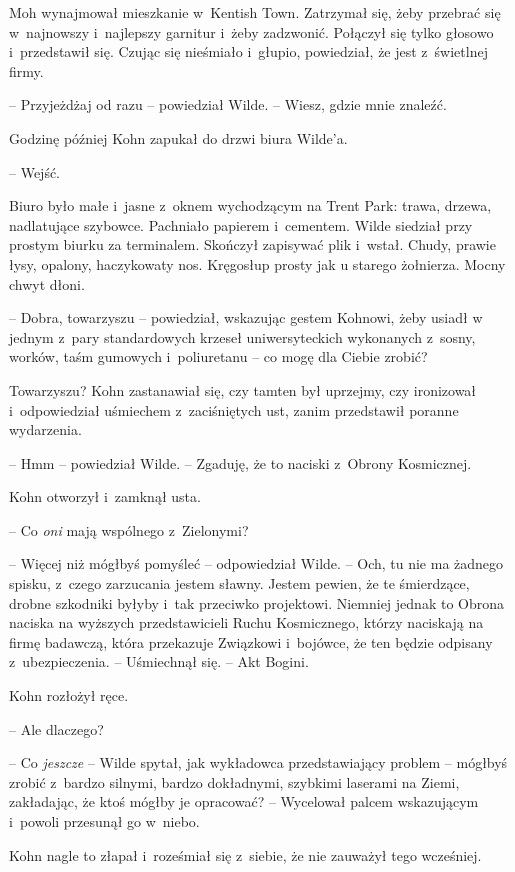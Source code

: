 \documentclass[oneside,polish,11pt,sfheadings]{mwbk}
\begin{document}
Moh wynajmował mieszkanie w~Kentish Town. Zatrzymał się, żeby przebrać
się w~najnowszy i~najlepszy garnitur i~żeby zadzwonić. Połączył się
tylko głosowo i~przedstawił się. Czując się nieśmiało i~głupio,
powiedział, że jest z~świetlnej firmy.

-- Przyjeżdżaj od razu -- powiedział Wilde. -- Wiesz, gdzie mnie znaleźć.

Godzinę później Kohn zapukał do drzwi biura Wilde'a.

-- Wejść.

Biuro było małe i~jasne z~oknem wychodzącym na Trent Park: trawa,
drzewa, nadlatujące szybowce. Pachniało papierem i~cementem. Wilde
siedział przy prostym biurku za terminalem. Skończył zapisywać plik i~wstał. Chudy, prawie łysy, opalony, haczykowaty nos. Kręgosłup prosty
jak u starego żołnierza. Mocny chwyt dłoni.

-- Dobra, towarzyszu -- powiedział, wskazując gestem Kohnowi, żeby usiadł
w jednym z~pary standardowych krzeseł uniwersyteckich wykonanych z~sosny, worków, taśm gumowych i~poliuretanu -- co mogę dla Ciebie zrobić?

Towarzyszu? Kohn zastanawiał się, czy tamten był uprzejmy, czy
ironizował i~odpowiedział uśmiechem z~zaciśniętych ust, zanim
przedstawił poranne wydarzenia.

-- Hmm -- powiedział Wilde. -- Zgaduję, że to naciski z~Obrony Kosmicznej.

Kohn otworzył i~zamknął usta.

 -- Co \emph{oni} mają wspólnego z~Zielonymi?

-- Więcej niż mógłbyś pomyśleć -- odpowiedział Wilde. -- Och, tu nie ma
żadnego spisku, z~czego zarzucania jestem sławny. Jestem pewien, że te
śmierdzące, drobne szkodniki byłyby i~tak przeciwko projektowi. Niemniej
jednak to Obrona naciska na wyższych przedstawicieli Ruchu Kosmicznego,
którzy naciskają na firmę badawczą, która przekazuje Związkowi i~bojówce, że ten będzie odpisany z~ubezpieczenia. -- Uśmiechnął się. -- Akt
Bogini.

Kohn rozłożył ręce. 

-- Ale dlaczego?

-- Co \emph{jeszcze} -- Wilde spytał, jak wykładowca przedstawiający
problem -- mógłbyś zrobić z~bardzo silnymi, bardzo dokładnymi, szybkimi
laserami na Ziemi, zakładając, że ktoś mógłby je opracować? -- Wycelował
palcem wskazującym i~powoli przesunął go w~niebo.

Kohn nagle to złapał i~roześmiał się z~siebie, że nie zauważył tego
wcześniej. 
\end{document}
